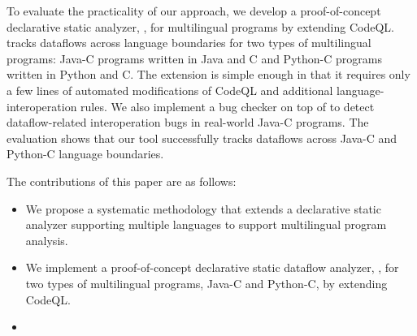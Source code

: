 To evaluate the practicality of our approach, we develop a proof-of-concept
declarative static analyzer, , for multilingual programs by
extending CodeQL. \ours tracks dataflows across language boundaries for two
types of
multilingual programs: Java-C programs written in Java and C and Python-C
programs written in Python and C. The extension is simple enough in that
it requires only a few lines of automated modifications of CodeQL and additional
language-interoperation rules. We also implement a bug checker on top of
\ours to detect dataflow-related interoperation bugs in real-world Java-C programs.
The evaluation shows that our tool successfully tracks dataflows across
Java-C and Python-C language boundaries. 

The contributions of this paper are as follows:
\begin{itemize}
\item We propose a systematic methodology that extends a declarative static analyzer
supporting multiple languages to support multilingual program analysis.

\item We implement a proof-of-concept declarative static dataflow analyzer,
, for two types of multilingual programs, Java-C and Python-C, by
extending CodeQL.

\item {}

\end{itemize}
